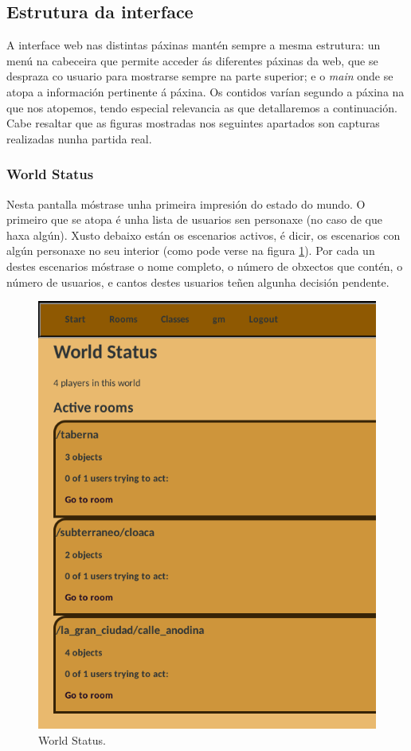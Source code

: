 \subsection{Estrutura da interface}
A interface web nas distintas páxinas mantén sempre a mesma estrutura: un menú
na cabeceira que permite acceder ás diferentes páxinas da web, que se despraza
co usuario para mostrarse sempre na parte superior; e o \textit{main} onde se
atopa a información pertinente á páxina. Os contidos varían segundo a páxina
na que nos atopemos, tendo especial relevancia as que detallaremos a
continuación. Cabe resaltar que as figuras mostradas nos seguintes apartados son
capturas realizadas nunha partida real.

\subsubsection{World Status}
Nesta pantalla móstrase unha primeira impresión do estado do mundo. O primeiro
que se atopa é unha lista de usuarios sen personaxe (no caso de que haxa algún).
Xusto debaixo están os escenarios activos, é dicir, os escenarios con algún
personaxe no seu interior (como pode verse na figura \ref{fig:demiurgoworld}).
Por cada un destes escenarios móstrase o nome completo, o número de obxectos que
contén, o número de usuarios, e cantos destes usuarios teñen algunha decisión
pendente.

\begin{figure}
\centerline{\includegraphics{figuras/demiurgo_world.png}}
\caption{World Status.}
\label{fig:demiurgoworld}
\end{figure}

